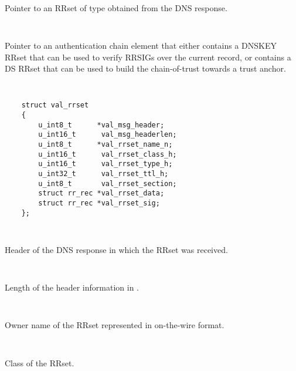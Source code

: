 \begin{description}
\begin{description}
\begin{description}
\begin{itemize}
\end{itemize}

\end{description}

\item {}\verb" "

Pointer to an RRset of type  obtained from the DNS
response.

\item {}\verb" "

Pointer to an authentication chain element that either contains a DNSKEY RRset
that can be used to verify RRSIGs over the current record, or contains a DS
RRset that can be used to build the chain-of-trust towards a trust anchor.

\end{description}

\item {}\verb" "

\begin{verbatim}
    struct val_rrset
    {
        u_int8_t      *val_msg_header; 
        u_int16_t      val_msg_headerlen;
        u_int8_t      *val_rrset_name_n; 
        u_int16_t      val_rrset_class_h;
        u_int16_t      val_rrset_type_h;
        u_int32_t      val_rrset_ttl_h;
        u_int8_t       val_rrset_section;
        struct rr_rec *val_rrset_data;
        struct rr_rec *val_rrset_sig;
    };
\end{verbatim}

\begin{description}

\item {}\verb" "

Header of the DNS response in which the RRset was received.

\item {}\verb" "

Length of the header information in .

\item {}\verb" "

Owner name of the RRset represented in on-the-wire format.

\item {}\verb" "

Class of the RRset.

\item {}\verb" "


\end{description}
\end{description}
